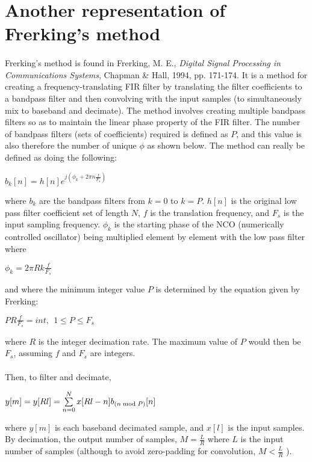 \documentclass{article}
\begin{document}
    \section{Another representation of Frerking's method}
        \paragraph{} 
        Frerking's method is found in Frerking, M. E., \textit{Digital Signal Processing in Communications Systems}, Chapman \& Hall, 1994, pp. 171-174. It is a method for creating a frequency-translating FIR filter by translating the filter coefficients to a bandpass filter and then convolving with the input samples (to simultaneously mix to baseband and decimate). The method involves creating multiple bandpass filters so as to maintain the linear phase property of the FIR filter. The number of bandpass filters (sets of coefficients) required is defined as $P$, and this value is also therefore the number of unique ${\phi}$ as shown below. The method can really be defined as doing the following:
        
        \begin{center}
            ${{b}_k[n]} = h[n]e^{j({\phi}_k + 2{\pi}n\frac{f}{{F}_s})} $
        \end{center}
        where ${b}_k$ are the bandpass filters from $k=0$ to $k=P$. ${h[n]}$ is the original low pass filter coefficient set of length $N$, $f$ is the translation frequency, and ${F}_s$ is the input sampling frequency. ${{\phi}_k}$ is the starting phase of the NCO (numerically controlled oscillator) being multiplied element by element with the low pass filter where 
        \begin{center}
            ${\phi}_k = 2{\pi}Rk{\frac{f}{{F}_s}}$
        \end{center}
        and where the minimum integer value $P$ is determined by the equation given by Frerking:
        \begin{center}
            $PR\frac{f}{{F}_s} = int,\ \ 1 \leq P \leq {F}_s $
        \end{center}
        where $R$ is the integer decimation rate. The maximum value of $P$ would then be ${F}_s$, assuming $f$ and ${F}_s$ are integers.
        \paragraph{}
        Then, to filter and decimate,
        \begin{center}
            ${y[m]} = {y[Rl]} = \sum\limits_{n=0}^N x[Rl-n]{b}_{(n{\bmod}P)}[n] $
        \end{center}
        where ${y[m]}$ is each baseband decimated sample,  and ${x[l]}$ is the input samples. By decimation, the output number of samples, $M = \frac{L}{R}$ where $L$ is the input number of samples (although to avoid zero-padding for convolution, $M< {\frac{L}{R}}$ ).
        
\end{document}
